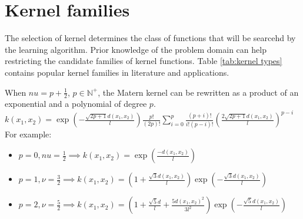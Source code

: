 \section{Kernel families}
The selection of kernel determines the class of functions that will be searcehd by the learning algorithm. Prior knowledge of the problem domain can help restricting the candidate families of kernel functions. 
Table \ref{tab:kernel types} contains popular kernel families in literature and applications.
\begin{table}
    \caption{Kernel types}
    \label{tab:kernel types}
\end{table}

When $nu=p+\frac{1}{2}$, $p \in \mathbb{N}^+$, the Matern kernel can be rewritten as a product of an exponential and a polynomial of degree $p$. 
$k(x_1,x_2)=\exp \left(-{\frac {{\sqrt {2p+1}}d(x_1,x_2)}{l }}\right){\frac {p!}{(2p)!}}\sum _{i=0}^{p}{\frac {(p+i)!}{i!(p-i)!}}\left({\frac {2{\sqrt {2p+1}}d(x_1,x_2)}{l }}\right)^{p-i}$
For example:
\begin{itemize}
    \item $p=0,nu=\frac{1}{2} \implies k(x_1,x_2)=\exp\left(\frac{-d(x_1,x_2)}{l}\right)$
    \item $p=1,\nu=\frac{3}{2} \implies 
    k(x_1,x_2)=\left(1+{\frac {{\sqrt {3}}d(x_1,x_2)}{l }}\right)\exp \left(-{\frac {{\sqrt {3}}d(x_1,x_2)}{l }}\right)$
    \item $p=2,\nu=\frac{5}{2} \implies k(x_1,x_2)=\left(1+{\frac {{\sqrt {5}}d}{l }}+{\frac {5d(x_1,x_2)^{2}}{3 l ^{2}}}\right)\exp \left(-{\frac {{\sqrt {5}}d(x_1, x_2)}{l }}\right)$
\end{itemize}


